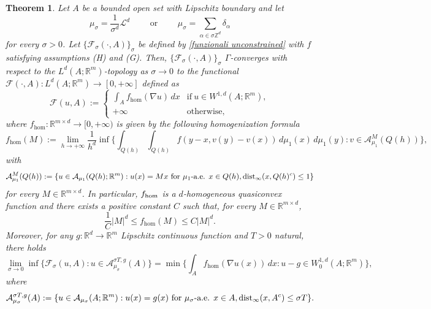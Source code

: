\documentclass{article}
\theoremstyle{plain}
\newtheorem{theorem}{Theorem}[section]
\theoremstyle{definition}
\def\rr{{\mathbb R}}
\def\ZZ{{\mathbb Z}}
\def\ms{\mu_\sigma}
\newcommand{\s}{\sigma}
\numberwithin{equation}{section}
\begin{document}
\begin{theorem}\label{theorem: Gamma unconstrained}
    Let $A$ be a bounded open set with Lipschitz boundary and let 
    \begin{equation*}
 \ms=
        \frac{1}{\s^d}\mathcal{L}^d \qquad \text{ or } \qquad \ms=
        \sum_{\alpha\in \s\ZZ^d}\delta_\alpha
\end{equation*}
 for every $\s>0$. Let $\{\mathcal{F}_\s(\cdot,A)\}_\s$ be defined by \eqref{funzionali unconstrained} with $f$ satisfying assumptions {\rm (H)} and {\rm (G)}. Then, $\{\mathcal{F}_\s(\cdot, A)\}_\s$ $\Gamma$-converges with respect to the $L^{d}(A;\mathbb{R}^{m})$-topology as $\s\to0$ to the functional $\mathcal{F}(\cdot,A):L^d(A;\mathbb{R}^{m})\rightarrow [0,+\infty]$ defined as 
    \begin{equation*}\mathcal{F}(u,A):=
        \begin{cases}
            \displaystyle
            \int_{A}f_{\hom}(\nabla u)\, dx &\text{if}\ u \in W^{1,d}(A;\mathbb{R}^m),\\
            +\infty &\text {otherwise},
        \end{cases}
    \end{equation*}
    where $f_{\hom}:\mathbb{R}^{m\times d}\rightarrow [0,+\infty)$ is  given by the following homogenization formula
    \begin{equation}
       f_{\hom}(M):=\lim_{h \rightarrow +\infty}\frac{1}{h^{d}}\inf\Big\{\int_{Q(h)}\int_{Q(h)}f(y-x,v(y)-v(x))\, d\mu_1(x)\, d\mu_1(y) : v\in \mathcal{A}^M_{\mu_1}(Q(h))\Big\},
        \label{f_hom}
    \end{equation}
    with 
    \begin{equation}\label{A^M}
        \mathcal{A}^M_{\mu_1}(Q(h)):=\{u \in \mathcal{A}_{\mu_1}(Q(h);\mathbb{R}^{m}): u(x)=Mx \text{ for } \mu_1\text{-a.e. } x \in Q(h),  \text{\rm dist}_\infty(x, Q(h)^c)\leq 1\}
    \end{equation}
    for every $M\in\rr^{m\times d}$. In particular, $f_{\rm hom}$ is a $d$-homogeneous quasiconvex function and there exists a positive constant $C$ such that, for every $M \in \mathbb{R}^{m \times d}$,
    \begin{equation}
    \label{crescita dell' omogenizzata}
        \frac{1}{C}|M|^{d}\le f_{\hom}(M)\le C|M|^{d}.
    \end{equation}
    Moreover, for any $g:\mathbb{R}^d\to\mathbb{R}^m$ Lipschitz continuous function and $T>0$ natural, there holds 
    \begin{equation*}
        \lim_{\s\to 0}\inf\{\mathcal{F}_\s(u,A):u \in \mathcal{A}_{\ms}^{\s T,g}(A)\}=\min\Big\{\int_{A}f_{\hom}(\nabla u(x))\, dx: u-g \in W^{1,d}_0(A;\mathbb{R}^{m})\Big\},
    \end{equation*}
    where 
    \begin{equation}\label{A^sT}
        \mathcal{A}_{\ms}^{\s T,g}(A):=\{u \in \mathcal{A}_{\ms}(A;\rr^m) : u(x)=g(x) \text{ for } \ms \text{-a.e. } x \in A, \text{\rm dist}_\infty(x, A^c)\leq  \s T\}.
    \end{equation}
\end{theorem}
\end{document}
